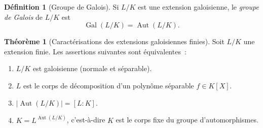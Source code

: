 \documentclass[12pt,a4paper,openany]{book}
\theoremstyle{definition}
\newtheorem{definition}{Définition}[chapter]
\newtheorem{theoreme}{Théorème}[chapter]
\newcommand{\Gal}{\operatorname{Gal}}
\newcommand{\Aut}{\operatorname{Aut}}
\begin{document}
\begin{definition}[Groupe de Galois]\label{def:groupe-galois}
Si $L/K$ est une extension galoisienne, le \emph{groupe de Galois} de
$L/K$ est
\[
  \Gal(L/K) = \Aut(L/K).
\]
\end{definition}

\begin{theoreme}[Caractérisations des extensions galoisiennes finies]\label{thm:caract-galoisienne}
Soit $L/K$ une extension finie. Les assertions suivantes sont équivalentes~:
\begin{enumerate}[label=(\roman*)]
  \item $L/K$ est galoisienne (normale et séparable).
  \item $L$ est le corps de décomposition d'un polynôme séparable
    $f \in K[X]$.
  \item $|\Aut(L/K)| = [L:K]$.
  \item $K = L^{\Aut(L/K)}$, c'est-à-dire $K$ est le corps fixe du
    groupe d'automorphismes.
\end{enumerate}
\end{theoreme}
\end{document}
